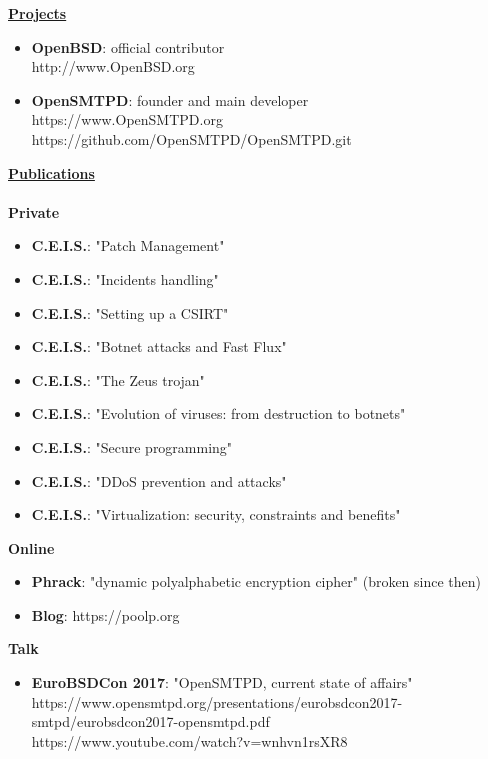\documentclass[a4paper,10pt]{letter}
\begin{document}
\pagebreak

\underline{\textbf{Projects}}\\
\begin{itemize}
\item	\textbf{OpenBSD}: official contributor\\
  http://www.OpenBSD.org\\
\item	\textbf{OpenSMTPD}: founder and main developer\\
  https://www.OpenSMTPD.org\\
  https://github.com/OpenSMTPD/OpenSMTPD.git\\
\end{itemize}

\underline{\textbf{Publications}}\\
\\
\textbf{Private}
\begin{itemize}
\item	\textbf{C.E.I.S.}: "Patch Management"
\item	\textbf{C.E.I.S.}: "Incidents handling"
\item	\textbf{C.E.I.S.}: "Setting up a CSIRT"
\item	\textbf{C.E.I.S.}: "Botnet attacks and Fast Flux"
\item	\textbf{C.E.I.S.}: "The Zeus trojan"
\item	\textbf{C.E.I.S.}: "Evolution of viruses: from destruction to botnets"
\item	\textbf{C.E.I.S.}: "Secure programming"
\item	\textbf{C.E.I.S.}: "DDoS prevention and attacks"
\item	\textbf{C.E.I.S.}: "Virtualization: security, constraints and benefits"\\
\end{itemize}

\textbf{Online}
\begin{itemize}
\item	\textbf{Phrack}: "dynamic polyalphabetic encryption cipher" (broken since then)
\item	\textbf{Blog}: https://poolp.org\\
\end{itemize}

\textbf{Talk}
\begin{itemize}
\item	\textbf{EuroBSDCon 2017}: "OpenSMTPD, current state of affairs"\\
  https://www.opensmtpd.org/presentations/eurobsdcon2017-smtpd/eurobsdcon2017-opensmtpd.pdf\\
  https://www.youtube.com/watch?v=wnhvn1rsXR8\\
\end{itemize}
\end{document}
